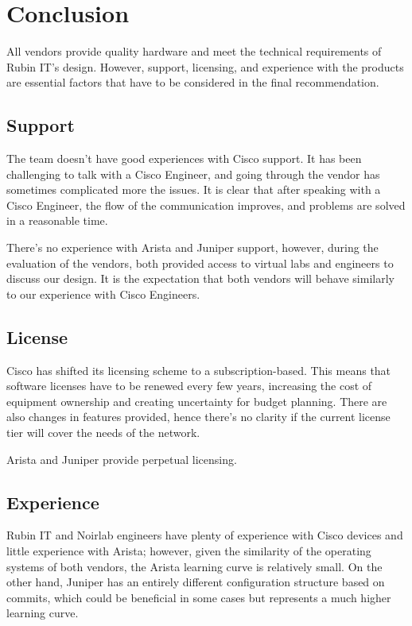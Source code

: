 \section{Conclusion}

All vendors provide quality hardware and meet the technical requirements of Rubin IT's design. However, support, licensing, and experience with the products are essential factors that have to be considered in the final recommendation. 

\subsection{Support}
The team doesn't have good experiences with Cisco support. It has been challenging to talk with a Cisco Engineer, and going through the vendor has sometimes complicated more the issues. It is clear that after speaking with a Cisco Engineer, the flow of the communication improves, and problems are solved in a reasonable time. 

There's no experience with Arista and Juniper support, however, during the evaluation of the vendors, both provided access to virtual labs and engineers to discuss our design. It is the expectation that both vendors will behave similarly to our experience with Cisco Engineers. 

\subsection{License}
Cisco has shifted its licensing scheme to a subscription-based. This means that software licenses have to be renewed every few years, increasing the cost of equipment ownership and creating uncertainty for budget planning. There are also changes in features provided, hence there's no clarity if the current license tier will cover the needs of the network.

Arista and Juniper provide perpetual licensing.

\subsection{Experience}
Rubin IT and Noirlab engineers have plenty of experience with Cisco devices and little experience with Arista; however, given the similarity of the operating systems of both vendors, the Arista learning curve is relatively small. On the other hand, Juniper has an entirely different configuration structure based on commits, which could be beneficial in some cases but represents a much higher learning curve. 

